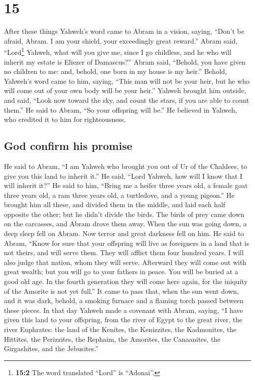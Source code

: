 \hypertarget{section-14}{%
\section{15}\label{section-14}}

 After these things Yahweh's word came to Abram in a
vision, saying, ``Don't be afraid, Abram. I am your shield, your
exceedingly great reward.''  Abram said, ``Lord\footnote{\textbf{15:2}
  The word translated ``Lord'' is ``Adonai''.} Yahweh, what will you
give me, since I go childless, and he who will inherit my estate is
Eliezer of Damascus?''  Abram said, ``Behold, you have
given no children to me: and, behold, one born in my house is my heir.''
 Behold, Yahweh's word came to him, saying, ``This man
will not be your heir, but he who will come out of your own body will be
your heir.''  Yahweh brought him outside, and said, ``Look
now toward the sky, and count the stars, if you are able to count
them.'' He said to Abram, ``So your offspring will be.'' 
He believed in Yahweh, who credited it to him for righteousness.

\hypertarget{god-confirm-his-promise}{%
\subsection{God confirm his promise}\label{god-confirm-his-promise}}

 He said to Abram, ``I am Yahweh who brought you out of Ur
of the Chaldees, to give you this land to inherit it.'' 
He said, ``Lord Yahweh, how will I know that I will inherit it?''
 He said to him, ``Bring me a heifer three years old, a
female goat three years old, a ram three years old, a turtledove, and a
young pigeon.''  He brought him all these, and divided
them in the middle, and laid each half opposite the other; but he didn't
divide the birds.  The birds of prey came down on the
carcasses, and Abram drove them away.  When the sun was
going down, a deep sleep fell on Abram. Now terror and great darkness
fell on him.  He said to Abram, ``Know for sure that your
offspring will live as foreigners in a land that is not theirs, and will
serve them. They will afflict them four hundred years.  I
will also judge that nation, whom they will serve. Afterward they will
come out with great wealth;  but you will go to your
fathers in peace. You will be buried at a good old age. 
In the fourth generation they will come here again, for the iniquity of
the Amorite is not yet full.''  It came to pass that,
when the sun went down, and it was dark, behold, a smoking furnace and a
flaming torch passed between these pieces.  In that day
Yahweh made a covenant with Abram, saying, ``I have given this land to
your offspring, from the river of Egypt to the great river, the river
Euphrates:  the land of the Kenites, the Kenizzites, the
Kadmonites,  the Hittites, the Perizzites, the Rephaim,
 the Amorites, the Canaanites, the Girgashites, and the
Jebusites.''

